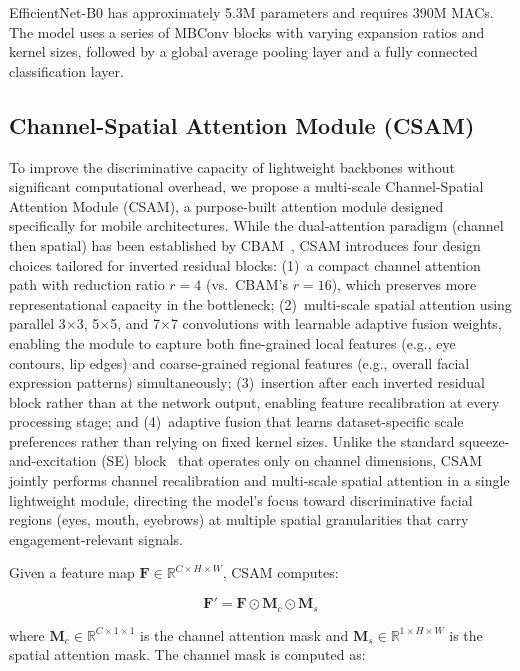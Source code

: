 \documentclass[sensors,article,submit,pdftex,moreauthors]{Definitions/mdpi}
\begin{document}
EfficientNet-B0 has approximately 5.3M parameters and requires 390M MACs. The model uses a series of MBConv blocks with varying expansion ratios and kernel sizes, followed by a global average pooling layer and a fully connected classification layer.

\subsection{Channel-Spatial Attention Module (CSAM)}

To improve the discriminative capacity of lightweight backbones without significant computational overhead, we propose a multi-scale Channel-Spatial Attention Module (CSAM), a purpose-built attention module designed specifically for mobile architectures. While the dual-attention paradigm (channel then spatial) has been established by CBAM~\cite{woo2018cbam}, CSAM introduces four design choices tailored for inverted residual blocks: (1)~a compact channel attention path with reduction ratio $r=4$ (vs.\ CBAM's $r=16$), which preserves more representational capacity in the bottleneck; (2)~multi-scale spatial attention using parallel 3$\times$3, 5$\times$5, and 7$\times$7 convolutions with learnable adaptive fusion weights, enabling the module to capture both fine-grained local features (e.g., eye contours, lip edges) and coarse-grained regional features (e.g., overall facial expression patterns) simultaneously; (3)~insertion after each inverted residual block rather than at the network output, enabling feature recalibration at every processing stage; and (4)~adaptive fusion that learns dataset-specific scale preferences rather than relying on fixed kernel sizes. Unlike the standard squeeze-and-excitation (SE) block~\cite{howard2019mobilenetv3} that operates only on channel dimensions, CSAM jointly performs channel recalibration and multi-scale spatial attention in a single lightweight module, directing the model's focus toward discriminative facial regions (eyes, mouth, eyebrows) at multiple spatial granularities that carry engagement-relevant signals.

Given a feature map $\mathbf{F} \in \mathbb{R}^{C \times H \times W}$, CSAM computes:

\begin{equation}
\mathbf{F}' = \mathbf{F} \odot \mathbf{M}_c \odot \mathbf{M}_s
\end{equation}

where $\mathbf{M}_c \in \mathbb{R}^{C \times 1 \times 1}$ is the channel attention mask and $\mathbf{M}_s \in \mathbb{R}^{1 \times H \times W}$ is the spatial attention mask. The channel mask is computed as:
\end{document}
